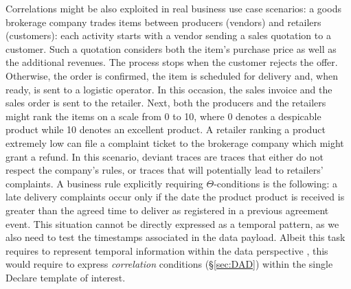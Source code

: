 Correlations might be also exploited in real business use case scenarios: a goods brokerage company \cite{PetermannJMR14} trades items between producers (vendors) and retailers (customers): each activity starts with a vendor sending a sales quotation to a customer. Such a quotation considers both the item's purchase price as well as the additional revenues. The process stops when the customer rejects the offer. Otherwise, the order is confirmed, the item is scheduled for delivery and, when ready, is sent to a logistic operator. In this occasion, the sales invoice and the sales order is sent to the retailer. Next, both the producers and the retailers might rank the items on a scale from 0 to 10, where 0 denotes a despicable product while 10 denotes an excellent product. A retailer ranking a product extremely low can file a complaint ticket to the brokerage company which might grant a refund.
In this scenario, deviant traces are traces that either do not respect the company's rules, or traces that will potentially lead to retailers' complaints. %
A business rule explicitly requiring $\Theta$-conditions is the following:   a late delivery complaints occur only if the date the product product is received is greater than the agreed time to deliver as registered in a previous agreement event. This situation cannot be directly expressed as a temporal pattern, as we also need to test the timestamps associated in the data payload. Albeit this task requires to represent temporal information within the data perspective \cite{MultiPerspective}, this would require to express \textit{correlation} conditions (\S\ref{sec:DAD}) within the single Declare template of interest. 



